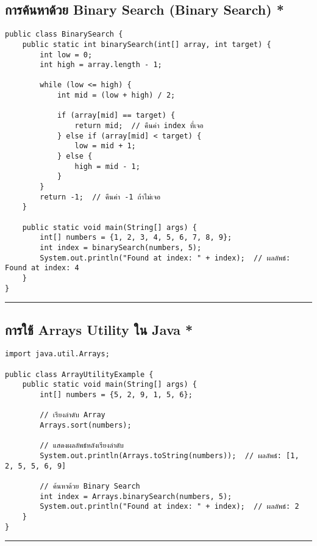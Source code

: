 \documentclass[11pt]{article}
\begin{document}
\subsection{การค้นหาด้วย Binary Search (Binary Search) \textbf{*}}
\label{sec:orgcd2390e}
\begin{verbatim}
public class BinarySearch {
    public static int binarySearch(int[] array, int target) {
        int low = 0;
        int high = array.length - 1;

        while (low <= high) {
            int mid = (low + high) / 2;

            if (array[mid] == target) {
                return mid;  // คืนค่า index ที่เจอ
            } else if (array[mid] < target) {
                low = mid + 1;
            } else {
                high = mid - 1;
            }
        }
        return -1;  // คืนค่า -1 ถ้าไม่เจอ
    }

    public static void main(String[] args) {
        int[] numbers = {1, 2, 3, 4, 5, 6, 7, 8, 9};
        int index = binarySearch(numbers, 5);
        System.out.println("Found at index: " + index);  // ผลลัพธ์: Found at index: 4
    }
}
\end{verbatim}

\noindent\rule{\textwidth}{0.5pt}
\subsection{การใช้ Arrays Utility ใน Java *}
\label{sec:orgd370dc5}
\begin{verbatim}
import java.util.Arrays;

public class ArrayUtilityExample {
    public static void main(String[] args) {
        int[] numbers = {5, 2, 9, 1, 5, 6};

        // เรียงลำดับ Array
        Arrays.sort(numbers);

        // แสดงผลลัพธ์หลังเรียงลำดับ
        System.out.println(Arrays.toString(numbers));  // ผลลัพธ์: [1, 2, 5, 5, 6, 9]

        // ค้นหาด้วย Binary Search
        int index = Arrays.binarySearch(numbers, 5);
        System.out.println("Found at index: " + index);  // ผลลัพธ์: 2
    }
}
\end{verbatim}

\noindent\rule{\textwidth}{0.5pt}
\end{document}
